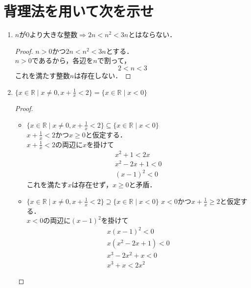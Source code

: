 \documentclass[a4paper,12pt]{ltjsarticle}
\newcommand{\R}{\mathbb{R}}
\begin{document}
\section{背理法を用いて次を示せ}
\begin{enumerate}[(1)]
    \item $nが0より大きな整数 \Rightarrow 2n < n^2 < 3n$とはならない．
        \begin{proof}
            $n > 0$かつ$2n < n^2 < 3n$とする． \\
            $n > 0$であるから，各辺を$n$で割って，
            \begin{equation*}
                2 < n < 3
            \end{equation*}
            これを満たす整数$n$は存在しない．
        \end{proof}
    \item $\{ x \in \R \mid x \neq 0, x + \frac{1}{x} < 2 \} = \{ x \in \R \mid x < 0\}$
        \begin{proof}
            \quad \\
            \begin{itemize}
                \item $\{ x \in \R \mid x \neq 0, x + \frac{1}{x} < 2 \} \subseteq \{ x \in \R \mid x < 0\}$ \\
                    $x + \frac{1}{x} < 2$かつ$x \geq 0$と仮定する． \\
                    $x + \frac{1}{x} < 2$の両辺に$x$を掛けて
                    \begin{gather*}
                        x^2 + 1 < 2x \\
                        x^2 - 2x + 1 < 0 \\
                        (x - 1)^2 < 0
                    \end{gather*}
                    これを満たす$x$は存在せず，$x \geq 0$と矛盾．
                \item $\{ x \in \R \mid x \neq 0, x + \frac{1}{x} < 2 \} \supseteq \{ x \in \R \mid x < 0\}$
                    $x < 0$かつ$x + \frac{1}{x} \geq 2$と仮定する． \\
                    $x < 0$の両辺に$(x - 1)^2$を掛けて
                    \begin{gather*}
                        x(x - 1)^2 < 0 \\
                        x(x^2 - 2x + 1) < 0 \\
                        x^3 - 2x^2 + x < 0 \\
                        x^3 + x < 2x^2

\end{gather*}
\end{itemize}
\end{proof}
\end{enumerate}
\end{document}

